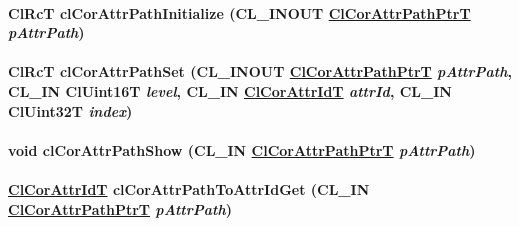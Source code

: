 \hypertarget{group__group13_ga131}{
\paragraph[clCorAttrPathInitialize]{\setlength{\rightskip}{0pt plus 5cm}Cl\-Rc\-T cl\-Cor\-Attr\-Path\-Initialize (CL\_\-INOUT \hyperlink{struct_cl_cor_attr_path}{Cl\-Cor\-Attr\-Path\-Ptr\-T} {\em p\-Attr\-Path})}\hfill}
\label{group__group13_ga131}


\hypertarget{group__group13_ga134}{
\paragraph[clCorAttrPathSet]{\setlength{\rightskip}{0pt plus 5cm}Cl\-Rc\-T cl\-Cor\-Attr\-Path\-Set (CL\_\-INOUT \hyperlink{struct_cl_cor_attr_path}{Cl\-Cor\-Attr\-Path\-Ptr\-T} {\em p\-Attr\-Path}, CL\_\-IN Cl\-Uint16T {\em level}, CL\_\-IN \hyperlink{group__group13_ga3}{Cl\-Cor\-Attr\-Id\-T} {\em attr\-Id}, CL\_\-IN Cl\-Uint32T {\em index})}\hfill}
\label{group__group13_ga134}


\hypertarget{group__group13_ga137}{
\paragraph[clCorAttrPathShow]{\setlength{\rightskip}{0pt plus 5cm}void cl\-Cor\-Attr\-Path\-Show (CL\_\-IN \hyperlink{struct_cl_cor_attr_path}{Cl\-Cor\-Attr\-Path\-Ptr\-T} {\em p\-Attr\-Path})}\hfill}
\label{group__group13_ga137}


\hypertarget{group__group13_ga138}{
\paragraph[clCorAttrPathToAttrIdGet]{\setlength{\rightskip}{0pt plus 5cm}\hyperlink{group__group13_ga3}{Cl\-Cor\-Attr\-Id\-T} cl\-Cor\-Attr\-Path\-To\-Attr\-Id\-Get (CL\_\-IN \hyperlink{struct_cl_cor_attr_path}{Cl\-Cor\-Attr\-Path\-Ptr\-T} {\em p\-Attr\-Path})}\hfill}
\label{group__group13_ga138}


